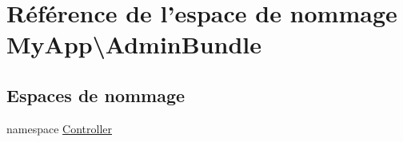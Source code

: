 \hypertarget{namespace_my_app_1_1_admin_bundle}{\section{Référence de l'espace de nommage My\-App\textbackslash{}Admin\-Bundle}
\label{namespace_my_app_1_1_admin_bundle}
}
\subsection*{Espaces de nommage}
\begin{DoxyCompactItemize}
\item 
namespace \hyperlink{namespace_my_app_1_1_admin_bundle_1_1_controller}{Controller}
\end{DoxyCompactItemize}
